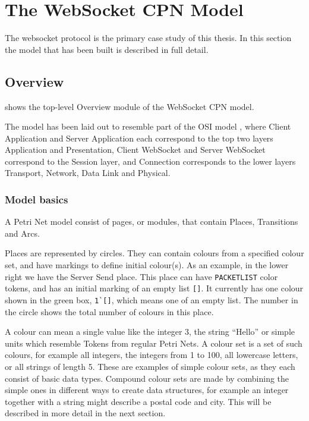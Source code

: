 \section{The WebSocket CPN Model}

The websocket protocol is the primary case study of this thesis. 
In this section the model that has been built is described in full detail.

\subsection{Overview}

	
	 shows the top-level Overview module of the WebSocket
	CPN model.
	
	The model has been laid out to resemble part of the OSI model \cite{osi7}, where
	Client Application and Server Application each correspond to the top two
	layers Application and Presentation, Client WebSocket and Server WebSocket
	correspond to the Session layer, and Connection corresponds to the lower layers
	Transport, Network, Data Link and Physical.
	
	\subsubsection{Model basics}
	A Petri Net model consist of pages, or modules, that contain Places,
	Transitions and Arcs.
	
	Places are represented by circles. They can contain colours from a specified
	colour set, and have markings to define initial colour(s).  As an example, in
	the lower right we have the Server Send place. This place can have
	\lstinline:PACKETLIST: color tokens, and has an initial marking of an empty
	list \lstinline:[]:. It currently has one colour shown in the green box,
	\lstinline:1`[]:, which means one of an empty list. The number in the circle
	shows the total number of colours in this place.
	
	A colour can mean a single value like the integer 3, the string ``Hello'' or
	simple units which resemble Tokens from regular Petri Nets. A colour set is a
	set of such colours, for example all integers, the integers from 1 to 100, all
	lowercase letters, or all strings of length 5. These are examples of simple
	colour sets, as they each consist of basic data types. Compound colour sets are
	made by combining the simple ones in different ways to create data structures, for
	example an integer together with a string might describe a postal code and
	city. This will be described in more detail in the next section.
	
